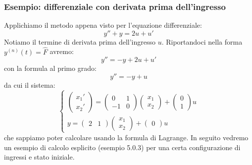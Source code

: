 \documentclass[a4paper,11pt]{article}
\begin{document}
\subsubsection{Esempio: differenziale con derivata prima dell'ingresso}
Applichiamo il metodo appena visto per l'equazione differenziale:
$$
y'' + y = 2u + u'
$$
Notiamo il termine di derivata prima dell'ingresso $u$.
Riportandoci nella forma $y^{(n)}(t) = \hat{F}$ avremo:
$$
y'' = - y + 2u + u'
$$
con la formula al primo grado:
$$
y'' = -y + u
$$
da cui il sistema:
\[
	\begin{cases}
		\begin{pmatrix}
			x_1' \\ x_2'
		\end{pmatrix}
		=
		\begin{pmatrix}
			0 & 1 \\ 
			-1 & 0
		\end{pmatrix}
		\begin{pmatrix}
			x_1 \\ x_2
		\end{pmatrix}
		+
		\begin{pmatrix}
		0 \\ 1
		\end{pmatrix}
		u \\ 

		y = 
		\begin{pmatrix}
			2 & 1
		\end{pmatrix}
		\begin{pmatrix}
			x_1 \\ x_2
		\end{pmatrix}
		+
		\begin{pmatrix}
			0
		\end{pmatrix}
		u
	\end{cases}
\]
che sappiamo poter calcolare usando la formula di Lagrange.
In seguito vedremo un esempio di calcolo esplicito (esempio 5.0.3) per una certa configurazione di ingressi e stato iniziale.
\end{document}
